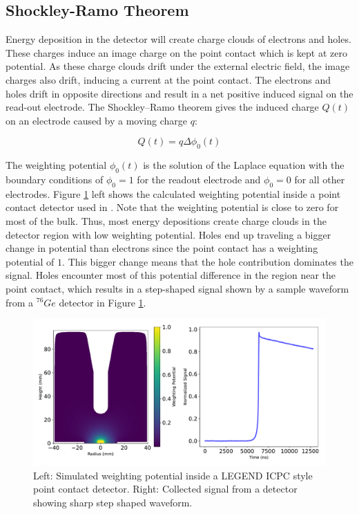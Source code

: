 \subsection{Shockley-Ramo Theorem}
Energy deposition in the detector will create charge clouds of electrons and holes. These charges induce an image charge on the point contact which is kept at zero potential. As these charge clouds drift under the external electric field, the image charges also drift, inducing a current at the point contact. The electrons and holes drift in opposite directions and result in a net positive induced signal on the read-out electrode. The Shockley–Ramo theorem gives the induced charge $Q(t)$ on an electrode caused by a moving charge $q$:

\begin{equation}\label{wp_eq}
Q(t)=q\Delta \phi_0(t)
\end{equation}

The weighting potential $\phi_0(t)$ is the solution of the Laplace equation with the boundary conditions of $\phi_0=1$ for the readout electrode and $\phi_0=0$ for all other electrodes. Figure \ref{fig:wp_signal} left shows the calculated weighting potential inside a point contact detector used in {\MJD}. Note that the weighting potential is close to zero for most of the bulk. Thus, most energy depositions create charge clouds in the detector region with low weighting potential. Holes end up traveling a bigger change in potential than electrons since the point contact has a weighting potential of $1$. This bigger change means that the hole contribution dominates the signal. Holes encounter most of this potential difference in the region near the point contact, which results in a step-shaped signal shown by a sample waveform from a ${}^{76}Ge$ detector in Figure \ref{fig:wp_signal}.

  \begin{figure}[htb]
  \centering
  \includegraphics[trim=0 0.5cm 0 0,clip,width=\linewidth]{ch2/figs/wp_det.pdf}
  \caption{Left: Simulated weighting potential inside a LEGEND ICPC style point contact detector. Right: Collected signal from a detector showing sharp step shaped waveform.}
    \label{fig:wp_signal}
  \end{figure}

